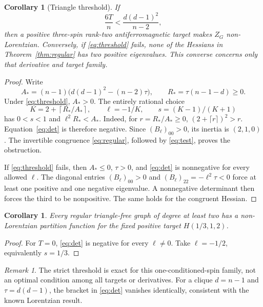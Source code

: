 \documentclass[11pt]{article}
\newtheorem{corollary}[theorem]{Corollary}
\theoremstyle{remark}
\newtheorem{remark}[theorem]{Remark}
\begin{document}
\begin{corollary}[Triangle threshold]\label{cor:regular}
If
\begin{equation}
 \frac{6T}{n}<\frac{d(d-1)^2}{n-2},                  \label{eq:threshold}
\end{equation}
then a positive three-spin rank-two antiferromagnetic target makes
$Z_G$ non-Lorentzian. Conversely, if \eqref{eq:threshold} fails,
none of the Hessians in Theorem~\ref{thm:regular} has two positive
eigenvalues. This converse concerns only that derivative and target
family.
\end{corollary}
\begin{proof}
Write
\[
 A_*=(n-1)\bigl(d(d-1)^2-(n-2)\tau\bigr),\qquad
 R_*=\tau(n-1-d)\geq0.
\]
Under \eqref{eq:threshold}, $A_*>0$. The entirely rational choice
\begin{equation}
 K=2+\left\lceil R_*/A_*\right\rceil,\qquad
 \ell=-1/K,\qquad s=(K-1)/(K+1)                     \label{eq:choice}
\end{equation}
has $0<s<1$ and $\ell^2R_*<A_*$. Indeed, for $r=R_*/A_*\geq0$,
$(2+\lceil r\rceil)^2>r$.
Equation~\eqref{eq:det} is therefore negative.
Since $(B_\ell)_{00}>0$, its inertia is $(2,1,0)$.
The invertible congruence \eqref{eq:regular}, followed by
\eqref{eq:test}, proves the obstruction.

If \eqref{eq:threshold} fails, then $A_*\leq0$, $\tau>0$,
and \eqref{eq:det} is nonnegative for every allowed $\ell$.
The diagonal entries $(B_\ell)_{00}>0$ and
$(B_\ell)_{22}=-\ell^2\tau<0$ force at least one positive and one
negative eigenvalue. A nonnegative determinant then forces the third
to be nonpositive. The same holds for the congruent Hessian.
\end{proof}

\begin{corollary}
Every regular triangle-free graph of degree at least two has a
non-Lorentzian partition function for the fixed positive target
$H(1/3,1,2)$.
\end{corollary}
\begin{proof}
For $T=0$, \eqref{eq:det} is negative for every $\ell\ne0$.
Take $\ell=-1/2$, equivalently $s=1/3$.
\end{proof}

\begin{remark}
The strict threshold is exact for this one-conditioned-spin family,
not an optimal condition among all targets or derivatives. For a
clique $d=n-1$ and $\tau=d(d-1)$, the bracket in
\eqref{eq:det} vanishes identically, consistent with the known
Lorentzian result.
\end{remark}
\end{document}
